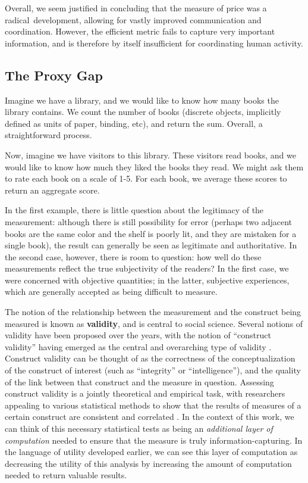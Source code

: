Overall, we seem justified in concluding that the measure of price was a radical development, allowing for vastly improved communication and coordination.
However, the efficient metric fails to capture very important information, and is therefore by itself insufficient for coordinating human activity.

\subsection{The Proxy Gap}

Imagine we have a library, and we would like to know how many books the library contains.
We count the number of books (discrete objects, implicitly defined as units of paper, binding, etc), and return the sum.
Overall, a straightforward process.

Now, imagine we have visitors to this library.
These visitors read books, and we would like to know how much they liked the books they read.
We might ask them to rate each book on a scale of 1-5. For each book, we average these scores to return an aggregate score.

In the first example, there is little question about the legitimacy of the measurement: although there is still possibility for error (perhaps two adjacent books are the same color and the shelf is poorly lit, and they are mistaken for a single book), the result can generally be seen as legitimate and authoritative.
In the second case, however, there is room to question: how well do these measurements reflect the true subjectivity of the readers?
In the first case, we were concerned with objective quantities; in the latter, subjective experiences, which are generally accepted as being difficult to measure.

\bigskip

The notion of the relationship between the measurement and the construct being measured is known as \textbf{validity}, and is central to social science.
Several notions of validity have been proposed over the years, with the notion of ``construct validity'' having emerged as the central and overarching type of validity \citep{cronbach:1955}.
Construct validity can be thought of as the correctness of the conceptualization of the construct of interest (such as ``integrity'' or ``intelligence''), and the quality of the link between that construct and the measure in question.
Assessing construct validity is a jointly theoretical and empirical task, with researchers appealing to various statistical methods to show that the results of measures of a certain construct are consistent and correlated \citep{campbell:1959}.
In the context of this work, we can think of this necessary statistical tests as being an \textit{additional layer of computation} needed to ensure that the measure is truly information-capturing.
In the language of utility developed earlier, we can see this layer of computation as decreasing the utility of this analysis by increasing the amount of computation needed to return valuable results.

